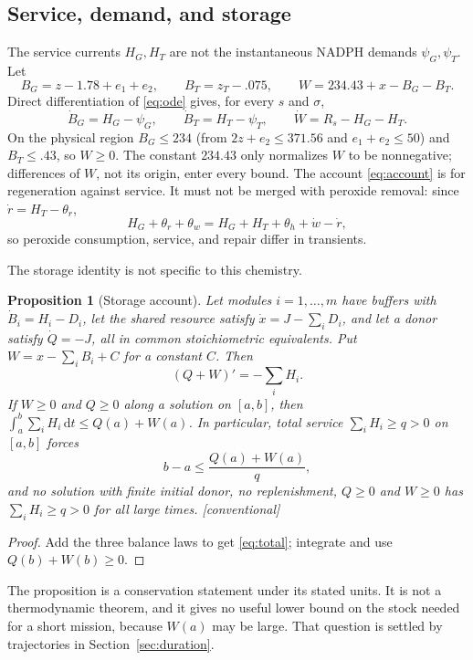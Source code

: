 \documentclass[11pt,a4paper]{article}
\theoremstyle{plain}
\newtheorem{proposition}[theorem]{Proposition}
\theoremstyle{definition}
\theoremstyle{remark}
\newcommand{\dd}{\,\mathrm d}
\newcommand{\HG}{H_G}
\newcommand{\HT}{H_T}
\newcommand{\evid}[1]{\textnormal{\textsf{\small[#1]}}}
\begin{document}
\subsection{Service, demand, and storage}
The service currents $\HG,\HT$ are not the instantaneous NADPH demands
$\psi_G,\psi_T$. Let
\begin{equation}\label{eq:storage}
B_G=z-1.78+e_1+e_2,\qquad B_T=z_T-.075,\qquad W=234.43+x-B_G-B_T.
\end{equation}
Direct differentiation of \eqref{eq:ode} gives, for every $s$ and $\sigma$,
\begin{equation}\label{eq:account}
\dot B_G=\HG-\psi_G,\qquad \dot B_T=\HT-\psi_T,\qquad \dot W=R_s-\HG-\HT.
\end{equation}
On the physical region $B_G\le234$ (from $2z+e_2\le371.56$ and
$e_1+e_2\le50$) and $B_T\le.43$, so $W\ge0$. The constant $234.43$ only
normalizes $W$ to be nonnegative; differences of $W$, not its origin, enter
every bound. The account \eqref{eq:account} is for regeneration against
service. It must not be merged with peroxide removal: since
$\dot r=\HT-\theta_r$,
\begin{equation}\label{eq:peroxide}
\HG+\theta_r+\theta_w=\HG+\HT+\theta_h+\dot w-\dot r,
\end{equation}
so peroxide consumption, service, and repair differ in transients.

The storage identity is not specific to this chemistry.

\begin{proposition}[Storage account]\label{prop:storage}
Let modules $i=1,\dots,m$ have buffers with $\dot B_i=H_i-D_i$, let the shared
resource satisfy $\dot x=J-\sum_iD_i$, and let a donor satisfy $\dot Q=-J$,
all in common stoichiometric equivalents. Put $W=x-\sum_iB_i+C$ for a constant
$C$. Then
\begin{equation}\label{eq:total}
(Q+W)'=-\sum_iH_i .
\end{equation}
If $W\ge0$ and $Q\ge0$ along a solution on $[a,b]$, then
$\int_a^b\sum_iH_i\dd t\le Q(a)+W(a)$. In particular, total service
$\sum_iH_i\ge q>0$ on $[a,b]$ forces
\[
b-a\le\frac{Q(a)+W(a)}{q},
\]
and no solution with finite initial donor, no replenishment, $Q\ge0$ and
$W\ge0$ has $\sum_iH_i\ge q>0$ for all large times. \evid{conventional}
\end{proposition}
\begin{proof}
Add the three balance laws to get \eqref{eq:total}; integrate and use
$Q(b)+W(b)\ge0$.
\end{proof}
The proposition is a conservation statement under its stated units. It is not
a thermodynamic theorem, and it gives no useful lower bound on the stock needed
for a short mission, because $W(a)$ may be large. That question is settled by
trajectories in Section~\ref{sec:duration}.
\end{document}
